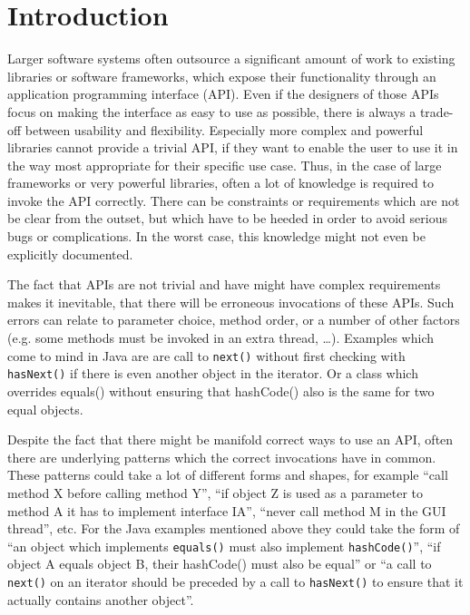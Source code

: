 \chapter{Introduction}\label{chapter:introduction}

Larger software systems often outsource a significant amount of work to existing libraries or software frameworks, which expose their functionality through an application programming interface (API).
Even if the designers of those APIs focus on making the interface as easy to use as possible, there is always a trade-off between usability and flexibility.
Especially more complex and powerful libraries cannot provide a trivial API, if they want to enable the user to use it in the way most appropriate for their specific use case.
Thus, in the case of large frameworks or very powerful libraries, often a lot of knowledge is required to invoke the API correctly.
There can be constraints or requirements which are not be clear from the outset, but which have to be heeded in order to avoid serious bugs or complications.
In the worst case, this knowledge might not even be explicitly documented.

The fact that APIs are not trivial and have might have complex requirements makes it inevitable, that there will be erroneous invocations of these APIs.
Such errors can relate to parameter choice, method order, or a number of other factors (e.g. some methods must be invoked in an extra thread, \ldots).
Examples which come to mind in Java are are call to \texttt{next()} without first checking with \texttt{hasNext()} if there is even another object in the iterator.
Or a class which overrides equals() without ensuring that hashCode() also is the same for two equal objects.

Despite the fact that there might be manifold correct ways to use an API, often there are underlying patterns which the correct invocations have in common.
These patterns could take a lot of different forms and shapes, for example ``call method X before calling method Y'', ``if object Z is used as a parameter to method A it has to implement interface IA'', ``never call method M in the GUI thread'', etc.
For the Java examples mentioned above they could take the form of ``an object which implements \texttt{equals()} must also implement \texttt{hashCode()}'', ``if object A equals object B, their hashCode() must also be equal'' or ``a call to \texttt{next()} on an iterator should be preceded by a call to \texttt{hasNext()} to ensure that it actually contains another object''.

